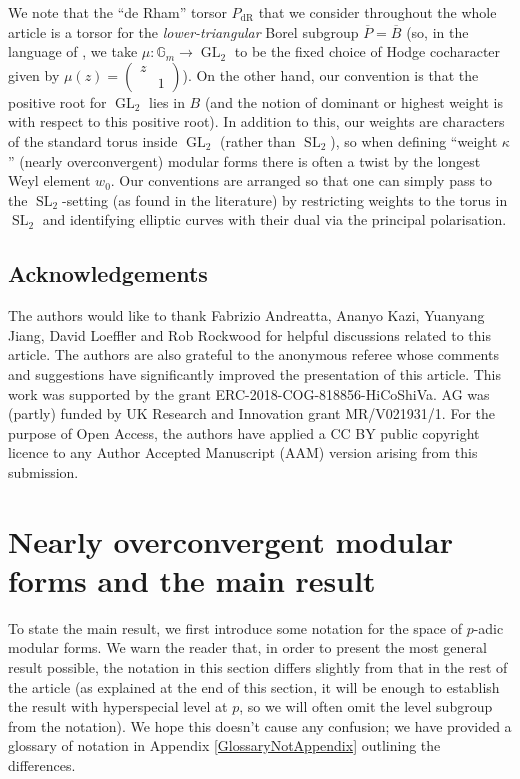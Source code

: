 \documentclass[10pt, oneside]{amsart}
\numberwithin{equation}{subsection}
\theoremstyle{definition}
\theoremstyle{remark}
\newcommand{\mbb}[1]{\mathbb{#1}}
\newcommand{\opn}[1]{\operatorname{#1}}
\begin{document}
We note that the ``de Rham'' torsor $P_{\opn{dR}}$ that we consider throughout the whole article is a torsor for the \emph{lower-triangular} Borel subgroup $\overline{P} = \overline{B}$ (so, in the language of \cite[\S 2]{CS17}, we take $\mu \colon \mbb{G}_m \to \opn{GL}_2$ to be the fixed choice of Hodge cocharacter given by $\mu(z) = \left( \begin{smallmatrix} z & \\ & 1 \end{smallmatrix} \right)$). On the other hand, our convention is that the positive root for $\opn{GL}_2$ lies in $B$ (and the notion of dominant or highest weight is with respect to this positive root). In addition to this, our weights are characters of the standard torus inside $\opn{GL}_2$ (rather than $\opn{SL}_2$), so when defining ``weight $\kappa$'' (nearly overconvergent) modular forms there is often a twist by the longest Weyl element $w_0$. Our conventions are arranged so that one can simply pass to the $\opn{SL}_2$-setting (as found in the literature) by restricting weights to the torus in $\opn{SL}_2$ and identifying elliptic curves with their dual via the principal polarisation.

\subsection{Acknowledgements}

The authors would like to thank Fabrizio Andreatta, Ananyo Kazi, Yuanyang Jiang, David Loeffler and Rob Rockwood for helpful discussions related to this article. The authors are also grateful to the anonymous referee whose comments and suggestions have significantly improved the presentation of this article. This work was supported by the grant ERC-2018-COG-818856-HiCoShiVa. AG was (partly) funded by UK Research and Innovation grant MR/V021931/1. For the purpose of Open Access, the authors have applied a CC BY public copyright licence to any Author Accepted Manuscript (AAM) version arising from this submission.

\section{Nearly overconvergent modular forms and the main result} \label{PadicMFsMainresultSec}

To state the main result, we first introduce some notation for the space of $p$-adic modular forms. We warn the reader that, in order to present the most general result possible, the notation in this section differs slightly from that in the rest of the article (as explained at the end of this section, it will be enough to establish the result with hyperspecial level at $p$, so we will often omit the level subgroup from the notation). We hope this doesn't cause any confusion; we have provided a glossary of notation in Appendix \ref{GlossaryNotAppendix} outlining the differences.
\end{document}
